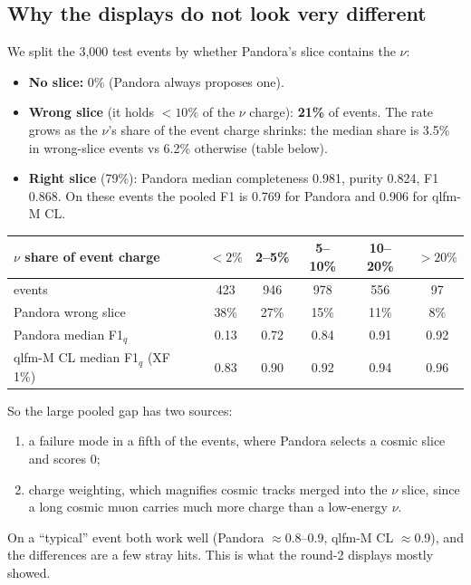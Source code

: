 \documentclass[11pt,a4paper]{article}
\begin{document}
\subsection{Why the displays do not look very different}
We split the 3{,}000 test events by whether Pandora's slice contains the $\nu$:
\begin{itemize}
  \item \textbf{No slice:} 0\% (Pandora always proposes one).
  \item \textbf{Wrong slice} (it holds $<10\%$ of the $\nu$ charge): \textbf{21\%} of events. The rate grows as the $\nu$'s share of the event charge shrinks: the median share is 3.5\% in wrong-slice events vs 6.2\% otherwise (table below).
  \item \textbf{Right slice} (79\%): Pandora median completeness 0.981, purity 0.824, F1 0.868. On these events the pooled F1 is 0.769 for Pandora and 0.906 for qlfm-M CL.
\end{itemize}
\begin{center}\small
\begin{tabular}{lccccc}\toprule
$\nu$ share of event charge & $<2\%$ & 2--5\% & 5--10\% & 10--20\% & $>20\%$\\\midrule
events & 423 & 946 & 978 & 556 & 97\\
Pandora wrong slice & 38\% & 27\% & 15\% & 11\% & 8\%\\
Pandora median F1$_q$ & 0.13 & 0.72 & 0.84 & 0.91 & 0.92\\
qlfm-M CL median F1$_q$ (XF 1\%) & 0.83 & 0.90 & 0.92 & 0.94 & 0.96\\\bottomrule
\end{tabular}
\end{center}
So the large pooled gap has two sources:
\begin{enumerate}
  \item a failure mode in a fifth of the events, where Pandora selects a cosmic slice and scores 0;
  \item charge weighting, which magnifies cosmic tracks merged into the $\nu$ slice, since a long cosmic muon carries much more charge than a low-energy $\nu$.
\end{enumerate}
On a ``typical'' event both work well (Pandora $\approx$0.8--0.9, qlfm-M CL $\approx$0.9), and the differences are a few stray hits. This is what the round-2 displays mostly showed.
\end{document}
